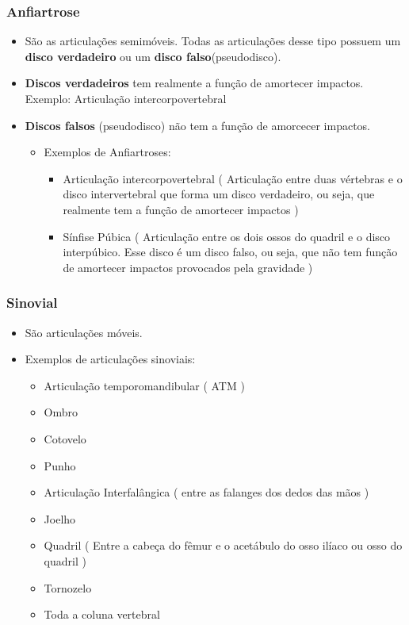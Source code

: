 \documentclass[
]{book}
\providecommand{\tightlist}{%
  \setlength{\itemsep}{0pt}\setlength{\parskip}{0pt}}
\begin{document}
\hypertarget{anfiartrose}{%
\subsubsection{Anfiartrose}\label{anfiartrose}}

\begin{itemize}
\item
  São as articulações semimóveis. Todas as articulações desse tipo possuem um \textbf{disco verdadeiro} ou um \textbf{disco falso}(pseudodisco).
\item
  \textbf{Discos verdadeiros} tem realmente a função de amortecer impactos. Exemplo: Articulação intercorpovertebral
\item
  \textbf{Discos falsos} (pseudodisco) não tem a função de amorcecer impactos.

  \begin{itemize}
  \tightlist
  \item
    Exemplos de Anfiartroses:

    \begin{itemize}
    \tightlist
    \item
      Articulação intercorpovertebral ( Articulação entre duas vértebras e o disco intervertebral que forma um disco verdadeiro, ou seja, que realmente tem a função de amortecer impactos )
    \item
      Sínfise Púbica ( Articulação entre os dois ossos do quadril e o disco interpúbico. Esse disco é um disco falso, ou seja, que não tem função de amortecer impactos provocados pela gravidade )
    \end{itemize}
  \end{itemize}
\end{itemize}

\hypertarget{sinovial}{%
\subsubsection{Sinovial}\label{sinovial}}

\begin{itemize}
\item
  São articulações móveis.
\item
  Exemplos de articulações sinoviais:

  \begin{itemize}
  \tightlist
  \item
    Articulação temporomandibular ( ATM )
  \item
    Ombro
  \item
    Cotovelo
  \item
    Punho
  \item
    Articulação Interfalângica ( entre as falanges dos dedos das mãos )
  \item
    Joelho
  \item
    Quadril ( Entre a cabeça do fêmur e o acetábulo do osso ilíaco ou osso do quadril )
  \item
    Tornozelo
  \item
    Toda a coluna vertebral
  \end{itemize}
\end{itemize}
\end{document}
